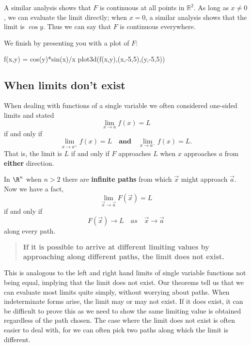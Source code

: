 \documentclass{ximera}
\begin{document}
\begin{example}
\begin{explanation}
    A similar analysis shows that $F$ is continuous at all points in
    $\mathbb{R}^2$. As long as $x\neq0$, we can evaluate the limit
    directly; when $x=0$, a similar analysis shows that the limit is $\cos
    y$. Thus we can say that $F$ is continuous everywhere.
    \begin{onlineOnly}
      We finish by presenting you with a plot of $F$:
\begin{sageCell}
f(x,y) = cos(y)*sin(x)/x
plot3d(f(x,y),(x,-5,5),(y,-5,5))
\end{sageCell}
    \end{onlineOnly}
  \end{explanation}
\end{example}


\subsection{When limits don't exist}

When dealing with functions of a single variable we often considered
one-sided limits and stated
\[
\lim_{x\to a}f(x) = L
\]
if and only if
\[
\lim_{x\to a^+}f(x) =L \quad\textbf{and}\quad \lim_{x\to a^-}f(x) =L.
\]
That is, the limit is $L$ if and only if $F$ approaches $L$ when
$x$ approaches $a$ from \textbf{either} direction.

In $\R^n$ when $n>2$ there are \textbf{infinite paths} from which
$\vec{x}$ might approach $\vec{a}$. Now we have a fact, 
\[
\lim_{\vec{x}\to \vec{a}}F(\vec{x}) = L
\]
if and only if
\[
F(\vec{x})\to  L \quad{as}\quad \vec{x}\to \vec{a}
\]
along every path.
\begin{quote}
  \textbf{If it is possible to arrive at different limiting values by
    approaching along different paths, the limit does not exist.}
\end{quote}
This is analogous to the left and right hand limits of single variable
functions not being equal, implying that the limit does not exist.
Our theorems tell us that we can evaluate most limits quite simply,
without worrying about paths. When indeterminate forms arise, the
limit may or may not exist. If it does exist, it can be difficult to
prove this as we need to show the same limiting value is obtained
regardless of the path chosen.  The case where the limit does not
exist is often easier to deal with, for we can often pick two paths
along which the limit is different.
\end{document}
